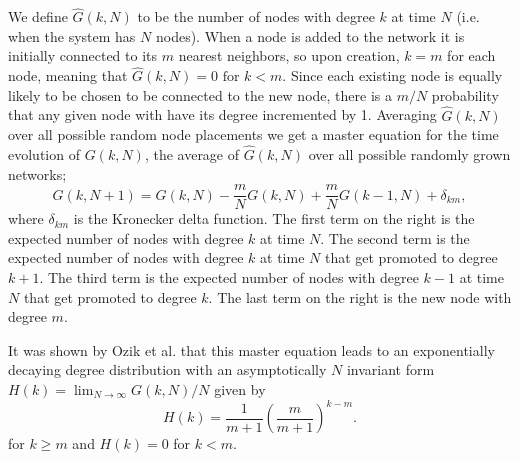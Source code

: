\documentclass[aps,pre,reprint,superscriptaddress,amsmath,amssymb,nofootinbib]{revtex4-1}
\begin{document}
We define $\hat{G}(k,N)$ to be the number of nodes with degree $k$ at time $N$ (i.e. when the system has $N$ nodes).
When a node is added to the network it is initially connected to its $m$ nearest neighbors, so upon creation, $k = m$ for each node, meaning that $\hat{G}(k,N) = 0 \text{ for } k < m$.
Since each existing node is equally likely to be chosen to be connected to the new node, there is a $m/N$ probability that any given node with have its degree incremented by 1.
Averaging $\hat{G}(k,N)$ over all possible random node placements we get a master equation for the time evolution of $G(k,N)$, the average of $\hat{G}(k,N)$ over all possible randomly grown networks;
\begin{equation}
G(k,N+1) = G(k,N) - \frac{m}{N}G(k,N) + \frac{m}{N}G(k-1,N) + \delta_{km},
\end{equation}
\noindent where $\delta_{km}$ is the Kronecker delta function.
The first term on the right is the expected number of nodes with degree $k$ at time $N$.
The second term is the expected number of nodes with degree $k$ at time $N$ that get promoted to degree $k+1$.
The third term is the expected number of nodes with degree $k-1$ at time $N$ that get promoted to degree $k$.
The last term on the right is the new node with degree $m$.

It was shown by Ozik et al. \cite{ozik2004} that this master equation leads to an exponentially decaying degree distribution with an asymptotically $N$ invariant form $H(k) = \lim_{N \to \infty} G(k,N)/N$ given by
\begin{equation}\label{degeq}
H(k) = \frac{1}{m+1}\left(\frac{m}{m+1}\right)^{k-m}.
\end{equation}
\noindent for $k \geq m$ and $H(k) = 0$ for $k < m$.
\end{document}
